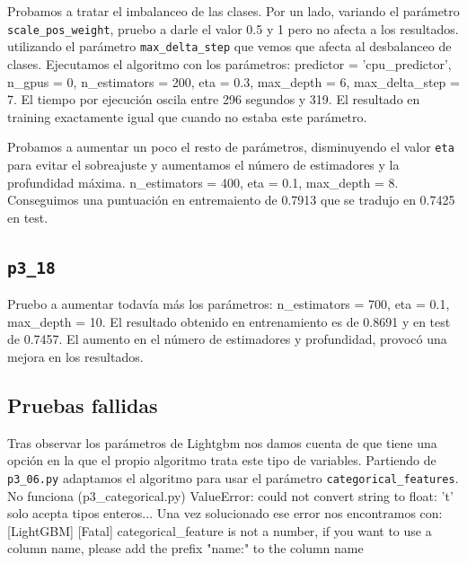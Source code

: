 \documentclass[a4paper, 20pt]{article}
\begin{document}
Probamos a tratar el imbalanceo de las clases. Por un lado, variando el parámetro \texttt{scale\_pos\_weight}, pruebo a darle el valor 0.5 y 1 pero no afecta a los resultados. utilizando el parámetro \texttt{max\_delta\_step} que vemos que afecta al desbalanceo de clases. Ejecutamos el algoritmo con los parámetros: {\ttfamily predictor = 'cpu\_predictor', n\_gpus = 0, n\_estimators = 200, eta = 0.3, max\_depth = 6, max\_delta\_step = 7}. El tiempo por ejecución oscila entre 296 segundos y 319. El resultado en training exactamente igual que cuando no estaba este parámetro.

Probamos a aumentar un poco el resto de parámetros, disminuyendo el valor \texttt{eta} para evitar el sobreajuste y aumentamos el número de estimadores y la profundidad máxima. {\ttfamily n\_estimators = 400, eta = 0.1, max\_depth = 8}. Conseguimos una puntuación en entremaiento de 0.7913 que se tradujo en 0.7425 en test.

\subsection{\texttt{p3\_18}}

Pruebo a aumentar todavía más los parámetros: {\ttfamily n\_estimators = 700, eta = 0.1, max\_depth = 10}. El resultado obtenido en entrenamiento es de 0.8691 y en test de 0.7457. El aumento en el número de estimadores y profundidad, provocó una mejora en los resultados.


\subsection{Pruebas fallidas}
Tras observar los parámetros de Lightgbm nos damos cuenta de que tiene una opción en la que el propio algoritmo trata este tipo de variables. Partiendo de \texttt{p3\_06.py} adaptamos el algoritmo para usar el parámetro \texttt{categorical\_features}.
 No funciona (p3\_categorical.py)
 ValueError: could not convert string to float: 't'
 solo acepta tipos enteros... Una vez solucionado ese error nos encontramos con:
 [LightGBM] [Fatal] categorical\_feature is not a number,
if you want to use a column name,
please add the prefix "name:" to the column name
\end{document}
